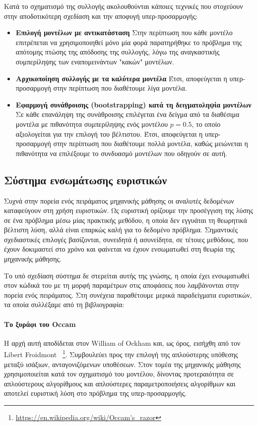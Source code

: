 Κατά το σχηματισμό της συλλογής ακολουθούνται κάποιες τεχνικές που στοχεύουν στην αποδοτικότερη σχεδίαση και την αποφυγή υπερ-προσαρμογής:
\begin{itemize}
	\item \textbf{Επιλογή μοντέλων με αντικατάσταση} Στην περίπτωση που κάθε μοντέλο επιτρέπεται να χρησιμοποιηθεί μόνο μία φορά παρατηρήθηκε το πρόβλημα της απότομης πτώσης της απόδοσης της συλλογής, λόγω της αναγκαστικής συμπερίληψης των εναπομεινάντων "κακών" μοντέλων. 
	\item \textbf{Αρχικοποίηση συλλογής με τα καλύτερα μοντέλα} Έτσι, αποφεύγεται η υπερ-προσαρ\-μογή στην περίπτωση που διαθέτουμε λίγα μοντέλα.
	\item \textbf{Εφαρμογή συνάθροισης (bootstrapping) κατά τη δειγματοληψία μοντέλων} Σε κάθε επανάληψη της συνάθροισης επιλέγεται ένα δείγμα από τα διαθέσιμα μοντέλα με πιθανότητα συμπερίληψης ενός μοντέλου $p=0.5$, το οποίο αξιολογείται για την επιλογή του βέλτιστου. Έτσι, αποφεύγεται η υπερ-προσαρμογή στην περίπτωση που διαθέτουμε πολλά μοντέλα, καθώς μειώνεται η πιθανότητα να επιλέξουμε το συνδυασμό μοντέλων που οδηγούν σε αυτή.
\end{itemize} 
\subsection{Σύστημα ενσωμάτωσης ευριστικών}
Συχνά στην πορεία ενός πειράματος μηχανικής μάθησης οι αναλυτές δεδομένων καταφεύγουν στη χρήση ευριστικών. Ως ευριστική ορίζουμε την προσέγγιση της λύσης σε ένα πρόβλημα μέσω μίας πρακτικής μεθόδου, η οποία δεν εγγυάται τη θεωρητικά βέλτιστη λύση, αλλά είναι επαρκώς καλή για το δεδομένο πρόβλημα. Σημαντικές σχεδιαστικές επιλογές βασίζονται, συνειδητά ή ασυνείδητα, σε τέτοιες μεθόδους, που έχουν δοκιμαστεί στο χρόνο και φαίνεται να έχουν ενσωματωθεί στη θεωρία της μηχανικής μάθησης.

Το υπό σχεδίαση σύστημα δε στερείται αυτής της γνώσης, η οποία έχει ενσωματωθεί στον κώδικά του με τη μορφή παραμέτρων στις αποφάσεις που λαμβάνονται στην πορεία ενός πειράματος. Στη συνέχεια παραθέτουμε μερικά παραδείγματα ευριστικών, τα οποία συλλέξαμε από τη βιβλιογραφία:

\paragraph{Το ξυράφι του Occam} Η αρχή αυτή αποδίδεται στον William of Ockham και, ως όρος, εισήχθη από τον Libert Froidmont ~\footnote{\url{https://en.wikipedia.org/wiki/Occam's\_razor}}. Συμβουλεύει προς την επιλογή της απλούστερης υπόθεσης μεταξύ ισάξιων, ανταγονιζόμενων υποθέσεων. Στον τομέα της μηχανικής μάθησης χρησιμοποιείται κατά τον σχηματισμό του μοντέλου, δίνοντας προτεραιότητα σε απλούστερους αλγορίθμους και απλούστερες παραμετροποιήσεις αλγορίθμων και αποτελεί ευριστική λύση στο πρόβλημα της υπερ-προσαρμογής. 

